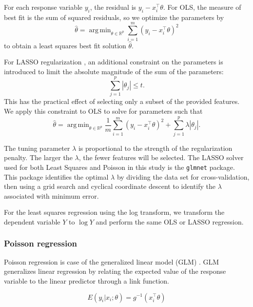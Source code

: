 \documentclass[11pt]{article}
\DeclareMathOperator*{\argmin}{arg\,min}
\begin{document}
For each response variable $y_i$, the residual is $y_i - x_i^{\top}\theta$. For OLS, the measure of best fit is the sum of squared residuals, so we optimize the parameters by
\[\hat{\theta} = \argmin_{\theta\in\mathbb{R}^p}\sum_{i=1}^m \left(y_i - x_i^\top\theta\right)^2\] to obtain a least squares best fit solution $\hat{\theta}$.

For LASSO regularization \cite{Tibshirani1996}, an additional constraint on the parameters is introduced to limit the absolute magnitude of the sum of the parameters: 
\[\sum_{j=1}^p |\theta_j|\leq t.\] This has the practical effect of selecting only a subset of the provided features. We apply this constraint to OLS to solve for parameters such that
\[\hat{\theta} = \argmin_{\theta\in\mathbb{R}^p} \frac{1}{m}\sum_{i=1}^m \left(y_i - x_i^\top\theta\right)^2 + \sum_{j=1}^p\lambda\left|\theta_j\right|.\]

The tuning parameter $\lambda$ is proportional to the strength of the regularization penalty. The larger the $\lambda$, the fewer features will be selected. The LASSO solver used for both Least Squares and Poisson in this study is the \texttt{glmnet} package. This package identifies the optimal $\lambda$ by dividing the data set for cross-validation, then using a grid search and cyclical coordinate descent to identify the $\lambda$ associated with minimum error.

For the least squares regression using the log transform, we transform the dependent variable $Y$ to $\log{Y}$ and perform the same OLS or LASSO regression.

\subsubsection{Poisson regression} \label{sec:poiss}

Poisson regression is case of the generalized linear model (GLM) \cite{nelder1972}. GLM generalizes linear regression by relating the expected value of the response variable to the linear predictor through a link function. 

\[E(y_i|x_i;\theta) = g^{-1}(x_i^{\top} \theta)\]
\end{document}

